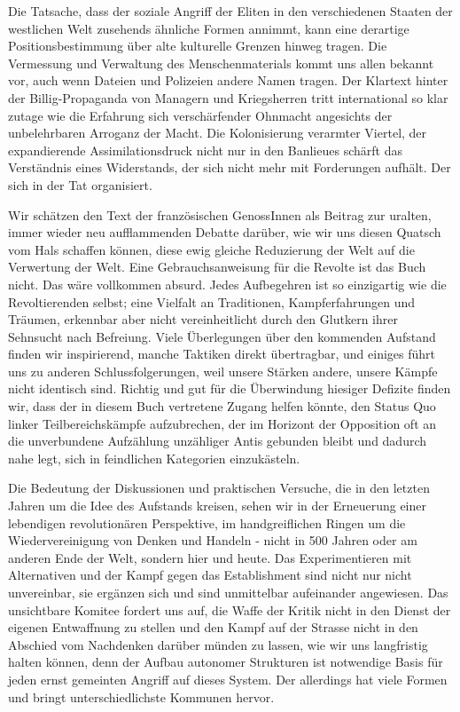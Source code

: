 Die Tatsache, dass der soziale Angriff der Eliten in den
verschiedenen Staaten der westlichen Welt zusehends ähnliche Formen
annimmt, kann eine derartige Positionsbestimmung über alte
kulturelle Grenzen hinweg tragen. Die Vermessung und Verwaltung des
Menschenmaterials kommt uns allen bekannt vor, auch wenn Dateien
und Polizeien andere Namen tragen. Der Klartext hinter der
Billig-Propaganda von Managern und Kriegsherren tritt international
so klar zutage wie die Erfahrung sich verschärfender Ohnmacht
angesichts der unbelehrbaren Arroganz der Macht. Die Kolonisierung
verarmter Viertel, der expandierende Assimilationsdruck nicht nur
in den Banlieues schärft das Verständnis eines Widerstands, der
sich nicht mehr mit Forderungen aufhält. Der sich in der Tat
organisiert.
\extrapar{}

Wir schätzen den Text der französischen GenossInnen als Beitrag zur
uralten, immer wieder neu aufflammenden Debatte darüber, wie wir
uns diesen Quatsch vom Hals schaffen können, diese ewig gleiche
Reduzierung der Welt auf die Verwertung der Welt. Eine
Gebrauchsanweisung für die Revolte ist das Buch nicht. Das wäre
vollkommen absurd. Jedes Aufbegehren ist so einzigartig wie die
Revoltierenden selbst; eine Vielfalt an Traditionen,
Kampferfahrungen und Träumen, erkennbar aber nicht vereinheitlicht
durch den Glutkern ihrer Sehnsucht nach Befreiung. Viele
Überlegungen über den kommenden Aufstand finden wir inspirierend,
manche Taktiken direkt übertragbar, und einiges führt uns zu
anderen Schlussfolgerungen, weil unsere Stärken andere, unsere
Kämpfe nicht identisch sind. Richtig und gut für die Überwindung
hiesiger Defizite finden wir, dass der in diesem Buch vertretene
Zugang helfen könnte, den Status Quo linker Teilbereichskämpfe
aufzubrechen, der im Horizont der Opposition oft an die
unverbundene Aufzählung unzähliger Antis gebunden bleibt und
dadurch nahe legt, sich in feindlichen Kategorien einzukästeln.
\extrapar{}

Die Bedeutung der Diskussionen und praktischen Versuche, die in den
letzten Jahren um die Idee des Aufstands kreisen, sehen wir in der
Erneuerung einer lebendigen revolutionären Perspektive, im
handgreiflichen Ringen um die Wiedervereinigung von Denken und
Handeln - nicht in 500 Jahren oder am anderen Ende der Welt,
sondern hier und heute. Das Experimentieren mit Alternativen und
der Kampf gegen das Establishment sind nicht nur nicht unvereinbar,
sie ergänzen sich und sind unmittelbar aufeinander angewiesen. Das
unsichtbare Komitee fordert uns auf, die Waffe der Kritik nicht in
den Dienst der eigenen Entwaffnung zu stellen und den Kampf auf der
Strasse nicht in den Abschied vom Nachdenken darüber münden zu
lassen, wie wir uns langfristig halten können, denn der Aufbau
autonomer Strukturen ist notwendige Basis für jeden ernst gemeinten
Angriff auf dieses System. Der allerdings hat viele Formen und
bringt unterschiedlichste Kommunen hervor.
\extrapar{}

